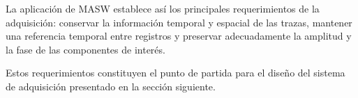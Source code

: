 La aplicación de MASW establece así los principales requerimientos de la adquisición: conservar la información temporal y espacial de las trazas, mantener una referencia temporal entre registros y preservar adecuadamente la amplitud y la fase de las componentes de interés.

Estos requerimientos constituyen el punto de partida para el diseño del sistema de adquisición presentado en la sección siguiente.
